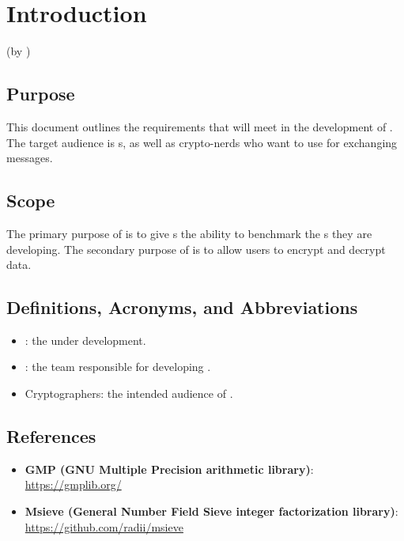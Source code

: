 \section{Introduction}
(by \md)


\subsection{Purpose}

This document outlines the requirements that \tc{} will meet
in the development of \cry{}. The target audience is \cg s,
as well as crypto-nerds who want to use
\cry{} for exchanging messages.


\subsection{Scope}

The primary purpose of \cry{} is to give \cg s the ability
to benchmark the \cs s they are developing. The secondary
purpose of \cry{} is to allow users to encrypt and decrypt
data.


\subsection{Definitions, Acronyms, and Abbreviations}

\begin{itemize}
\item \cry{}: the \cf{}  under development.
\item \tc{}: the team responsible for developing \cry{}.
\item Cryptographers: the intended audience of \cry{}.
\end{itemize}


\subsection{References}

\begin{itemize}
\item \textbf{GMP (GNU Multiple Precision arithmetic library)}:
  \url{https://gmplib.org/}
\item \textbf{Msieve (General Number Field Sieve
  integer factorization library)}:
  \url{https://github.com/radii/msieve}
\end{itemize}

